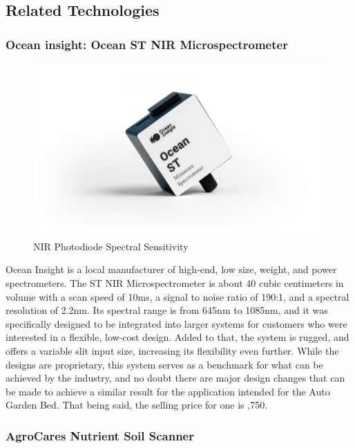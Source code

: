 \subsection{Related Technologies}

\subsubsection{Ocean insight: Ocean ST NIR Microspectrometer}

\begin{figure}[H]
    \caption{NIR Photodiode Spectral Sensitivity}
    \centering
    \includegraphics[width=\textwidth]{images/3.2.1Pic.png}
\end{figure}

Ocean Insight is a local manufacturer of high-end, low size, weight, and power spectrometers. The ST NIR Microspectrometer is about 40 cubic centimeters in volume with a scan speed of 10ms, a signal to noise ratio of 190:1, and a spectral resolution of 2.2nm. Its spectral range is from 645nm to 1085nm, and it was specifically designed to be integrated into larger systems for customers who were interested in a flexible, low-cost design. Added to that, the system is rugged, and offers a variable slit input size, increasing its flexibility even further. While the designs are proprietary, this system serves as a benchmark for what can be achieved by the industry, and no doubt there are major design changes that can be made to achieve a similar result for the application intended for the Auto Garden Bed. That being said, the selling price for one is ,750.

\subsubsection{AgroCares Nutrient Soil Scanner}

